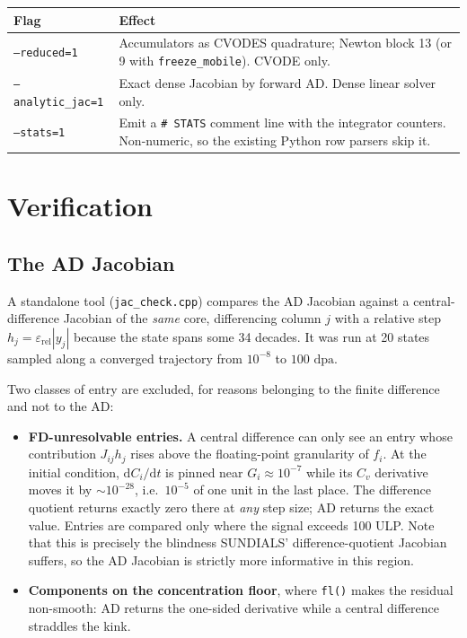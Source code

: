 \documentclass[11pt,a4paper]{article}
\newcommand{\code}[1]{\texttt{\small #1}}
\newcommand{\dpa}{\ensuremath{\mathrm{dpa}}}
\begin{document}
\begin{center}
\begin{tabular}{lp{10.2cm}}
\toprule
Flag & Effect \\
\midrule
\code{--reduced=1}      & Accumulators as CVODES quadrature; Newton block 13
                          (or 9 with \code{freeze\_mobile}). CVODE only. \\
\code{--analytic\_jac=1}& Exact dense Jacobian by forward AD. Dense linear
                          solver only. \\
\code{--stats=1}        & Emit a \code{\# STATS} comment line with the
                          integrator counters. Non-numeric, so the existing
                          Python row parsers skip it. \\
\bottomrule
\end{tabular}
\end{center}

\section{Verification}

\subsection{The AD Jacobian}

A standalone tool (\code{jac\_check.cpp}) compares the AD Jacobian against a
central-difference Jacobian of the \emph{same} core, differencing column $j$
with a relative step $h_j=\varepsilon_{\mathrm{rel}}|y_j|$ because the state
spans some 34 decades. It was run at 20 states sampled along a converged
trajectory from $10^{-8}$ to $100$ \dpa.

Two classes of entry are excluded, for reasons belonging to the finite
difference and not to the AD:

\begin{itemize}
\item \textbf{FD-unresolvable entries.} A central difference can only see an
      entry whose contribution $J_{ij}h_j$ rises above the floating-point
      granularity of $f_i$. At the initial condition, $\mathrm dC_i/\mathrm dt$
      is pinned near $G_i\approx10^{-7}$ while its $C_v$ derivative moves it by
      ${\sim}10^{-28}$, i.e.\ $10^{-5}$ of one unit in the last place. The
      difference quotient returns exactly zero there at \emph{any} step size;
      AD returns the exact value. Entries are compared only where the signal
      exceeds 100 ULP. Note that this is precisely the blindness SUNDIALS'
      difference-quotient Jacobian suffers, so the AD Jacobian is strictly more
      informative in this region.
\item \textbf{Components on the concentration floor}, where \code{fl()} makes
      the residual non-smooth: AD returns the one-sided derivative while a
      central difference straddles the kink.
\end{itemize}
\end{document}

